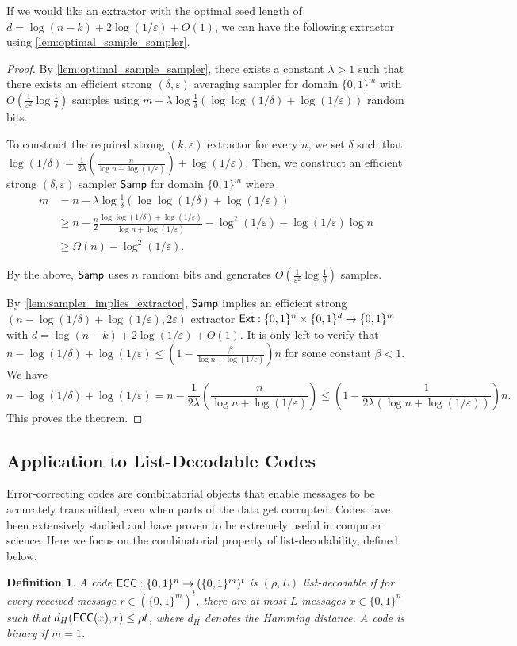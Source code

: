 \documentclass[10pt,a4paper]{article}
\newtheorem{definition}[theorem]{Definition}
\newcommand{\eps}{\varepsilon}
\newcommand{\1}{\mathbbm{1}}
\newcommand{\zo}{\{0, 1\}}
\newcommand{\Ext}{\textup{\textsf{Ext}}}
\newcommand{\Smp}{\textup{\textsf{Samp}}}
\begin{document}
If we would like an extractor with the optimal seed length of $d = \log(n - k) + 2 \log(1 / \eps) + O(1)$, we can have the following extractor using \cref{lem:optimal_sample_sampler}.
\OurOptimalExtractor*

\begin{proof}
    By \cref{lem:optimal_sample_sampler}, there exists a constant $\lambda > 1$ such that there exists an efficient strong $(\delta, \eps)$ averaging sampler for domain $\zo^m$ with $O(\frac{1}{\eps^2} \log \frac{1}{\delta})$ samples using $m + \lambda\log\frac{1}{\delta}(\log\log(1 / \delta) + \log(1 / \eps))$ random bits.

To construct the required strong $(k, \eps)$ extractor for every $n$, we set $\delta$ such that $\log(1 / \delta) = \frac{1}{2\lambda} (\frac{n}{\log n + \log(1 / \eps)}) + \log(1/\eps)$.
Then, we construct an efficient strong $(\delta, \eps)$ sampler $\Smp$ for domain $\zo^m$ where 
\begin{align*}
     m &= n - \lambda\log\frac{1}{\delta}(\log\log(1 / \delta) + \log(1 / \eps)) \\
     &\ge n - \frac{n}{2}\frac{\log\log(1 / \delta) + \log (1 / \eps)}{\log n + \log(1 / \eps)} - \log^2(1 / \eps) -  \log(1 / \eps)\log n \\
     &\ge \Omega(n) - \log^2(1 / \eps).
\end{align*}
   
 By the above, $\Smp$ uses $n$ random bits and generates $O(\frac{1}{\eps^{2}} \log \frac{1}{\delta})$ samples.

By~\cref{lem:sampler_implies_extractor}, $\Smp$ implies an efficient strong $( n - \log(1 / \delta) + \log (1 / \eps), 2\eps)$ extractor $\Ext: \zo^n \times \zo^d \to \zo^m$ with $d = \log (n-k) + 2 \log (1 / \eps) + O(1)$.
It is only left to verify that $ n - \log(1 / \delta) + \log (1 / \eps) \le (1 -  \frac{\beta}{\log n + \log (1 / \eps)})n$ for some constant $\beta < 1$. 
We have \[
 n - \log(1 / \delta) + \log (1 / \eps) = n - \frac{1}{2\lambda} (\frac{n}{\log n + \log(1 / \eps)}) \le (1 -  \frac{1}{2\lambda(\log n + \log (1 / \eps))})n.
\]
This proves the theorem.
\end{proof}





\subsection{Application to List-Decodable Codes}
Error-correcting codes are combinatorial objects that enable messages to be accurately transmitted, even when parts of the data get corrupted. Codes have been extensively studied and have proven to be extremely useful in computer science. Here we focus on the combinatorial property of list-decodability, defined below.
\begin{definition}
    A code ${\textup{\textsf{ECC}}} : \zo^n \rightarrow ({\zo^m})^t$ is $(\rho, L)$ list-decodable if for every received message $r \in (\zo^m)^t$, there are at most $L$ messages $x \in \zo^n$ such that $d_H({\textup{\textsf{ECC}}}(x),r) \le \rho t$, where $d_H$ denotes the Hamming distance. A code is binary if $m = 1$.
\end{definition}
\end{document}
